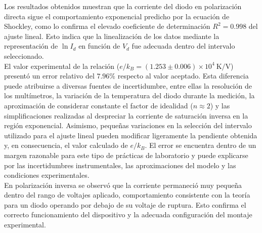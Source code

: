 Los resultados obtenidos muestran que la corriente del diodo en polarización directa sigue el comportamiento exponencial predicho por la ecuación de Shockley, como lo confirma el elevado coeficiente de determinación $R^2=0.998$ del ajuste lineal. Esto indica que la linealización de los datos mediante la representación de $\ln I_d$ en función de $V_d$ fue adecuada dentro del intervalo seleccionado.\\

El valor experimental de la relación ($e/k_B=(1.253\pm0.006)\times10^4\ \mathrm{K/V}$) presentó un error relativo del $7.96 \%$ respecto al valor aceptado. Esta diferencia puede atribuirse a diversas fuentes de incertidumbre, entre ellas la resolución de los multímetros, la variación de la temperatura del diodo durante la medición, la aproximación de considerar constante el factor de idealidad ($n\approx2$) y las simplificaciones realizadas al despreciar la corriente de saturación inversa en la región exponencial. Asimismo, pequeñas variaciones en la selección del intervalo utilizado para el ajuste lineal pueden modificar ligeramente la pendiente obtenida y, en consecuencia, el valor calculado de $e/k_B$. El error se encuentra dentro de un margen razonable para este tipo de prácticas de laboratorio y puede explicarse por las incertidumbres instrumentales, las aproximaciones del modelo y las condiciones experimentales.\\

En polarización inversa se observó que la corriente permaneció muy pequeña dentro del rango de voltajes aplicado, comportamiento consistente con la teoría para un diodo operando por debajo de su voltaje de ruptura. Esto confirma el correcto funcionamiento del dispositivo y la adecuada configuración del montaje experimental.\\

